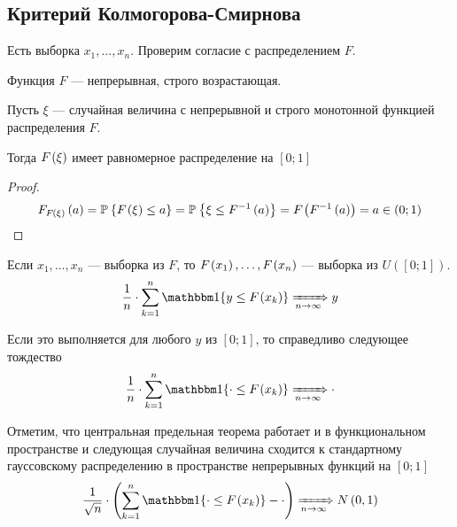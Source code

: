 \subsection{Критерий Колмогорова-Смирнова}

Есть выборка $x_1, \dots, x_n$. Проверим согласие с распределением $F$.

Функция $F$ --- непрерывная, строго возрастающая.

\begin{lemma}
    Пусть $\xi$ --- случайная величина с непрерывной и строго монотонной
    функцией распределения $F$.

    Тогда $F_{}\left(\xi\right)$ имеет равномерное распределение на $\left[ 0; 1 \right]$
\end{lemma}
\begin{proof}
    \begin{align*}
        F_{F_{}\left(\xi\right)}\left(a\right)
        = \mathbb{P}_{{}}\left\{ F_{}\left(\xi\right) \le a \right\}
        = \mathbb{P}_{{}}\left\{ \xi \le F^{-1}\left( a \right) \right\}
        = F_{}\left(F^{-1}\left( a \right)\right)
        = a \in \left( 0; 1 \right)
    \end{align*}
\end{proof}

Если $x_1, \dots, x_n$ --- выборка из $F$, то $F_{}\left(x_1\right), \dots, F_{}\left(x_n\right)$
--- выборка из $U\left( \left[ 0; 1 \right] \right)$.
\begin{align*}
    \frac{1}{n} \cdot \sum_{k=1}^{n}\Indicator{y \le \cdf{x_k}}
    \Covergence{} y
\end{align*}

Если это выполняется для любого $y$ из $\left[ 0; 1 \right]$, то справедливо
следующее тождество
\begin{align*}
    \frac{1}{n} \cdot \sum_{k=1}^{n}\Indicator{\cdot \le \cdf{x_k}}
    \Covergence{} \cdot
\end{align*}

Отметим, что центральная предельная теорема работает и в функциональном
пространстве и следующая случайная величина сходится к стандартному гауссовскому
распределению в пространстве непрерывных функций на $\left[ 0; 1 \right]$
\begin{align*}
    \frac{1}{\sqrt{n}} \cdot \left(
        \sum_{k=1}^{n}\Indicator{\cdot \le \cdf{x_k}} - \cdot \right)
    \Covergence{} N\left( 0, 1 \right)
\end{align*}

